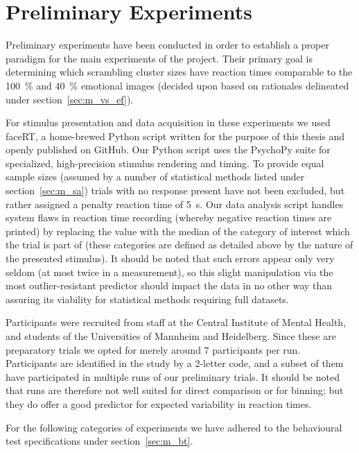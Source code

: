     \section{Preliminary Experiments}\label{sec:m_pe}
	Preliminary experiments have been conducted in order to establish a proper paradigm for the main experiments of the project. 
	Their primary goal is determining which scrambling cluster sizes have reaction times comparable to the \SI{100}{\percent} and \SI{40}{\percent} emotional images (decided upon based on rationales delineated under section~\ref{sec:m_vs_ef}).
	
	For stimulus presentation and data acquisition in these experiments we used faceRT\cite{faceRT}, a home-brewed Python script written for the purpose of this thesis and openly published on GitHub.
	Our Python script uses the PsychoPy suite\cite{Peirce2008} for specialized, high-precision stimulus rendering and timing.
	To provide equal sample sizes (assumed by a number of statistical methods listed under section~\ref{sec:m_sa}) trials with no response present have not been excluded, but rather assigned a penalty reaction time of \SI{5}{\second}.
	Our data analysis script handles system flaws in reaction time recording (whereby negative reaction times are printed) by replacing the value with the median of the category of interest which the trial is part of (these categories are defined as detailed above by the nature of the presented stimulus).
	It should be noted that such errors appear only very seldom (at most twice in a measurement), so this slight manipulation via the most outlier-resistant predictor should impact the data in no other way than assuring its viability for statistical methods requiring full datasets.  
	
	Participants were recruited from staff at the Central Institute of Mental Health, and students of the Universities of Mannheim and Heidelberg.
	Since these are preparatory trials we opted for merely around 7 participants per run.
	Participants are identified in the study by a 2-letter code, and a subset of them have participated in multiple runs of our preliminary trials.
	It should be noted that runs are therefore not well suited for direct comparison or for binning; but they do offer a good predictor for expected variability in reaction times.
	
	For the following categories of experiments we have adhered to the behavioural test specifications under section~\ref{sec:m_bt}.  
